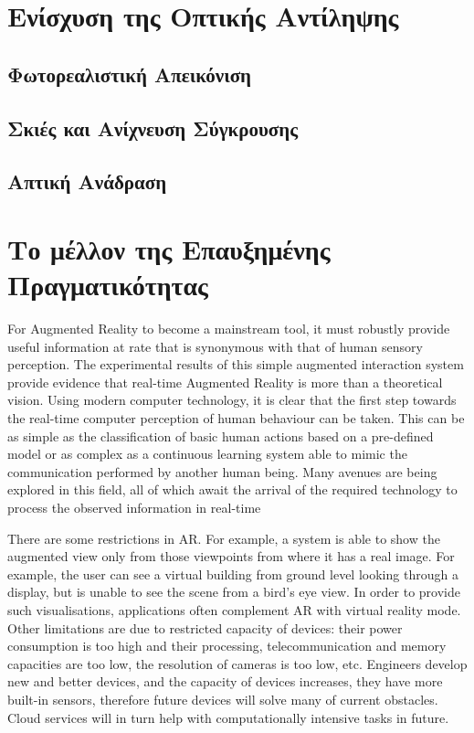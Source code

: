 \section{Ενίσχυση της Οπτικής Αντίληψης}
\subsection{Φωτορεαλιστική Απεικόνιση}
\subsection{Σκιές και Ανίχνευση Σύγκρουσης }
\subsection{Απτική Ανάδραση }

\section{Το μέλλον της Επαυξημένης Πραγματικότητας}

For Augmented Reality to become a mainstream tool, it must robustly provide useful information at rate that is synonymous with that of human sensory perception. The experimental results of this simple augmented interaction system provide evidence that real-time Augmented Reality is more than a theoretical vision. Using modern computer technology, it is clear that the first step towards the real-time computer perception of human behaviour can be taken. This can be as simple as the classification of basic human actions based on a pre-defined model or as complex as a continuous learning system able to mimic the communication performed by another human being. Many avenues are being explored in this field, all of which await the arrival of the required technology to process the observed information in real-time







There are some restrictions in AR. For example, a system is able to show the augmented view only from those viewpoints from where it has a real image. For example, the user can see a virtual building from ground level looking through a display, but is unable to see the scene from a bird's eye view. In order to provide such visualisations, applications often complement AR with virtual reality mode. Other limitations are due to restricted capacity of devices: their power consumption is too high and their processing, telecommunication and memory capacities are too low, the resolution of cameras is too low, etc. Engineers develop new and better devices, and the capacity of devices increases, they have more built-in sensors, therefore future devices will solve many of current obstacles. Cloud services will in turn help with computationally intensive tasks in future.

